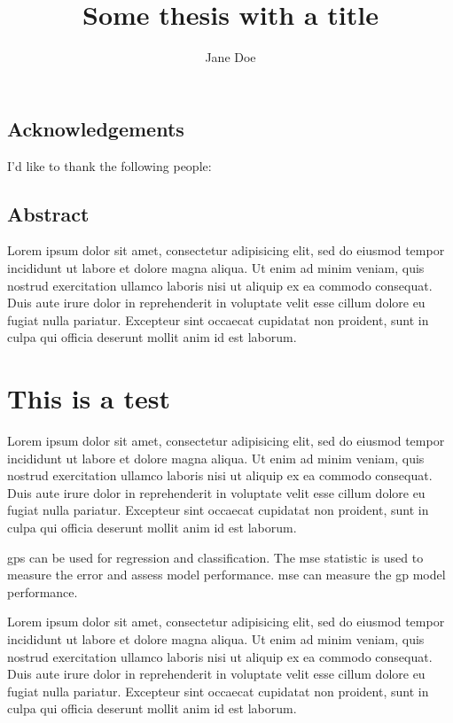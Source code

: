 \documentclass[a4paper,palatino,11pt,twoside]{thesis}
\title{Some thesis with a title}
\author{Jane Doe}
\begin{document}
    \startpreamble
    
    
    \section*{Acknowledgements}
    I'd like to thank the following people:
    
    \newpage
    \section*{Abstract}
    Lorem ipsum dolor sit amet, consectetur adipisicing elit, sed do eiusmod tempor incididunt ut labore et dolore magna aliqua. Ut enim ad minim veniam, quis nostrud exercitation ullamco laboris nisi ut aliquip ex ea commodo consequat. Duis aute irure dolor in reprehenderit in voluptate velit esse cillum dolore eu fugiat nulla pariatur. Excepteur sint occaecat cupidatat non proident, sunt in culpa qui officia deserunt mollit anim id est laborum.
    
    \tableofcontents
    \listoffigures
    \listoftables
    
    \cleardoublepage
    \markboth{\nomname}{\nomname}
    
    \printnomenclature[2cm]
    
    \stoppreamble
    
    \chapter{This is a test}
    Lorem ipsum dolor sit amet, consectetur adipisicing elit, sed do eiusmod tempor incididunt ut labore et dolore magna aliqua. Ut enim ad minim veniam, quis nostrud exercitation ullamco laboris nisi ut aliquip ex ea commodo consequat. Duis aute irure dolor in reprehenderit in voluptate velit esse cillum dolore eu fugiat nulla pariatur. Excepteur sint occaecat cupidatat non proident, sunt in culpa qui officia deserunt mollit anim id est laborum.
    
    \Glspl{gp} can be used for regression and classification. The \gls{mse} statistic is used to measure the error and assess model performance. \Gls{mse} can measure the \gls{gp} model performance.

    
    Lorem ipsum dolor sit amet, consectetur adipisicing elit, sed do eiusmod tempor incididunt ut labore et dolore magna aliqua. Ut enim ad minim veniam, quis nostrud exercitation ullamco laboris nisi ut aliquip ex ea commodo consequat. Duis aute irure dolor in reprehenderit in voluptate velit esse cillum dolore eu fugiat nulla pariatur. Excepteur sint occaecat cupidatat non proident, sunt in culpa qui officia deserunt mollit anim id est laborum.
    
\end{document}
